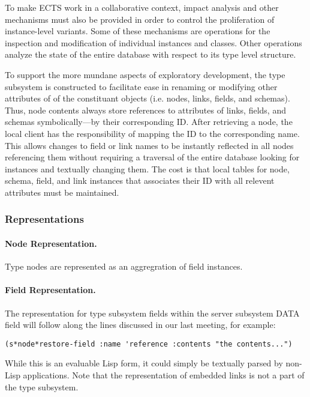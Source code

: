 To make ECTS work in a collaborative context, impact analysis and
other mechanisms must also be provided in order to control the
proliferation of instance-level variants.  Some of these mechanisms
are operations for the inspection and modification of individual
instances and classes.  Other operations analyze the state of the
entire database with respect to its type level structure.

To support the more mundane aspects of exploratory development, the
type subsystem is constructed to facilitate ease in renaming or
modifying other attributes of of the constituant objects (i.e. nodes,
links, fields, and schemas).  Thus, node contents always store
references to attributes of links, fields, and schemas
symbolically---by their corresponding ID.  After retrieving a node,
the local client has the responsibility of mapping the ID to the
corresponding name.  This allows changes to field or link names to be
instantly reflected in all nodes referencing them without requiring a
traversal of the entire database looking for instances and textually
changing them.  The cost is that local tables for node, schema, field,
and link instances that associates their ID with all relevent
attributes must be maintained.

\subsubsection{Representations}

\paragraph{Node Representation.}

Type nodes are represented as an aggregration of field instances.  

\paragraph{Field Representation.}

The representation for type subsystem fields within the server subsystem DATA 
field will follow along the lines discussed in our last meeting, for example:

\begin{verbatim}
(s*node*restore-field :name 'reference :contents "the contents...")
\end{verbatim}

While this is an evaluable Lisp form, it could simply be textually
parsed by non-Lisp applications.  Note that the representation of
embedded links is not a part of the type subsystem.

